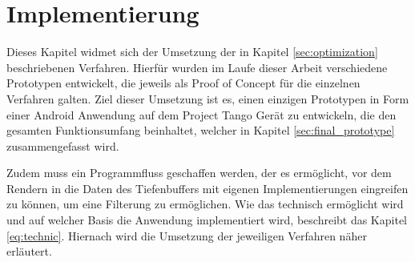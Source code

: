 \chapter{Implementierung} \label{sec:implementation}

Dieses Kapitel widmet sich der Umsetzung der in Kapitel \ref{sec:optimization} beschriebenen Verfahren. Hierfür wurden im Laufe dieser Arbeit verschiedene Prototypen entwickelt, die jeweils als Proof of Concept für die einzelnen Verfahren galten. Ziel dieser Umsetzung ist es, einen einzigen Prototypen in Form einer Android Anwendung auf dem Project Tango Gerät zu entwickeln, die den gesamten Funktionsumfang beinhaltet, welcher in Kapitel \ref{sec:final_prototype} zusammengefasst wird. 

Zudem muss ein Programmfluss geschaffen werden, der es ermöglicht, vor dem Rendern in die Daten des Tiefenbuffers mit eigenen Implementierungen eingreifen zu können, um eine Filterung zu ermöglichen. Wie das technisch ermöglicht wird und auf welcher Basis die Anwendung implementiert wird, beschreibt das Kapitel \ref{eq:technic}. Hiernach wird die Umsetzung der jeweiligen Verfahren näher erläutert.










